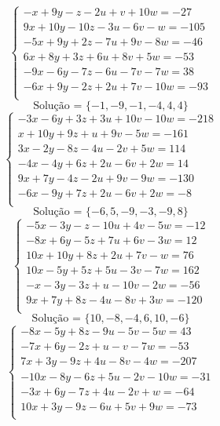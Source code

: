 \documentclass[12pt,oneside,a4paper]{article}
\begin{document}
\vspace{\baselineskip}
\begin{equation*}
\begin{cases}
-x+9y-z-2u+v+10w=-27 \\
9x+10y-10z-3u-6v-w=-105 \\
-5x+9y+2z-7u+9v-8w=-46 \\
6x+8y+3z+6u+8v+5w=-53 \\
-9x-6y-7z-6u-7v-7w=38 \\
-6x+9y-2z+2u+7v-10w=-93 \\
\end{cases}
\end{equation*}
\begin{equation*}
\text{Solução = }\{-1,-9,-1,-4,4,4\}
\end{equation*}
\vspace{\baselineskip}
\begin{equation*}
\begin{cases}
-3x-6y+3z+3u+10v-10w=-218 \\
x+10y+9z+u+9v-5w=-161 \\
3x-2y-8z-4u-2v+5w=114 \\
-4x-4y+6z+2u-6v+2w=14 \\
9x+7y-4z-2u+9v-9w=-130 \\
-6x-9y+7z+2u-6v+2w=-8 \\
\end{cases}
\end{equation*}
\begin{equation*}
\text{Solução = }\{-6,5,-9,-3,-9,8\}
\end{equation*}
\vspace{\baselineskip}
\begin{equation*}
\begin{cases}
-5x-3y-z-10u+4v-5w=-12 \\
-8x+6y-5z+7u+6v-3w=12 \\
10x+10y+8z+2u+7v-w=76 \\
10x-5y+5z+5u-3v-7w=162 \\
-x-3y-3z+u-10v-2w=-56 \\
9x+7y+8z-4u-8v+3w=-120 \\
\end{cases}
\end{equation*}
\begin{equation*}
\text{Solução = }\{10,-8,-4,6,10,-6\}
\end{equation*}
\vspace{\baselineskip}
\begin{equation*}
\begin{cases}
-8x-5y+8z-9u-5v-5w=43 \\
-7x+6y-2z+u-v-7w=-53 \\
7x+3y-9z+4u-8v-4w=-207 \\
-10x-8y-6z+5u-2v-10w=-31 \\
-3x+6y-7z+4u-2v+w=-64 \\
10x+3y-9z-6u+5v+9w=-73 \\
\end{cases}
\end{equation*}
\end{document}
